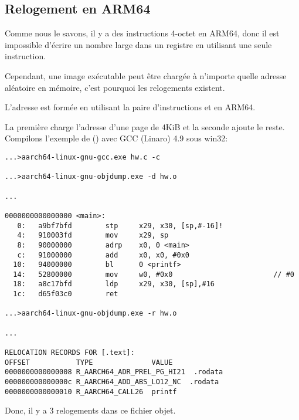 ﻿\newcommand{\ARMELF}{\InSqBrackets{\emph{ELF for the ARM 64-bit Architecture (AArch64)}, (2013)}\footnote{\AlsoAvailableAs \url{http://go.yurichev.com/17288}}}

\subsection{Relogement en ARM64}
\label{ARM64_relocs}

Comme nous le savons, il y a des instructions 4-octet en ARM64, donc il est impossible
d'écrire un nombre large dans un registre en utilisant une seule instruction.

Cependant, une image exécutable peut être chargée à n'importe quelle adresse aléatoire
en mémoire, c'est pourquoi les relogements existent.


L'adresse est formée en utilisant la paire d'instructions  et \ADD en ARM64.

La première charge l'adresse d'une page de 4KiB et la seconde ajoute le reste.
Compilons l'exemple de \q{\HelloWorldSectionName} () avec GCC (Linaro)
4.9 sous win32:

\begin{lstlisting}[caption=GCC (Linaro) 4.9 et objdump du fichier objet,style=customasmARM]
...>aarch64-linux-gnu-gcc.exe hw.c -c

...>aarch64-linux-gnu-objdump.exe -d hw.o

...

0000000000000000 <main>:
   0:   a9bf7bfd        stp     x29, x30, [sp,#-16]!
   4:   910003fd        mov     x29, sp
   8:   90000000        adrp    x0, 0 <main>
   c:   91000000        add     x0, x0, #0x0
  10:   94000000        bl      0 <printf>
  14:   52800000        mov     w0, #0x0                        // #0
  18:   a8c17bfd        ldp     x29, x30, [sp],#16
  1c:   d65f03c0        ret

...>aarch64-linux-gnu-objdump.exe -r hw.o

...

RELOCATION RECORDS FOR [.text]:
OFFSET           TYPE              VALUE
0000000000000008 R_AARCH64_ADR_PREL_PG_HI21  .rodata
000000000000000c R_AARCH64_ADD_ABS_LO12_NC  .rodata
0000000000000010 R_AARCH64_CALL26  printf
\end{lstlisting}

Donc, il y a 3 relogements dans ce fichier objet.

